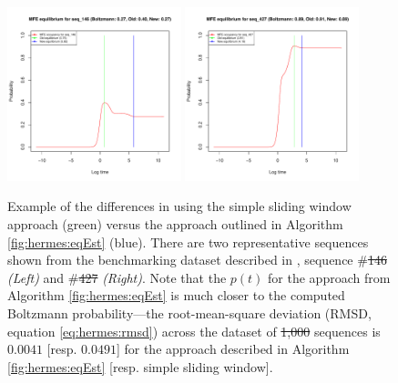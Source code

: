\documentclass[11pt, oneside]{Thesis} %
\providecommand{\DIFadd}[1]{{\protect\color{blue}\uwave{#1}}} %
\providecommand{\DIFdel}[1]{{\protect\color{red}\sout{#1}}}                      %
\providecommand{\DIFaddFL}[1]{\DIFadd{#1}} %
\providecommand{\DIFdelFL}[1]{\DIFdel{#1}} %
\providecommand{\DIFaddbeginFL}{} %
\providecommand{\DIFaddendFL}{} %
\providecommand{\DIFdelbeginFL}{} %
\providecommand{\DIFdelendFL}{} %
\begin{document}
\begin{figure}[!ht]
\centering
\includegraphics[width=0.45\textwidth]{Figures/Hermes/eqEstFromRnaEqSeq146.pdf}
\quad
\includegraphics[width=0.45\textwidth]{Figures/Hermes/eqEstFromRnaEqSeq427.pdf}
\caption[Example of the differences in using a sliding window approach for estimating \eqt versus a more robust approach, outlined in Algorithm \ref{fig:hermes:eqEst}]{Example of the differences in using the simple sliding window
approach (green) versus the approach outlined in Algorithm \ref{fig:hermes:eqEst}
(blue). There are two representative sequences shown from the benchmarking
dataset described in , sequence \#\DIFdelbeginFL \DIFdelFL{146
}\DIFdelendFL \DIFaddbeginFL \DIFaddFL{$146$
}\DIFaddendFL {\em (Left)} and \#\DIFdelbeginFL \DIFdelFL{427 }\DIFdelendFL \DIFaddbeginFL \DIFaddFL{$427$ }\DIFaddendFL {\em (Right)}. Note that the $p(t)$ for the approach from
Algorithm \ref{fig:hermes:eqEst} is much closer to the computed Boltzmann
probability---the root-mean-square deviation (RMSD, equation
\ref{eq:hermes:rmsd}) across the dataset of \DIFdelbeginFL \DIFdelFL{1,000 }\DIFdelendFL \DIFaddbeginFL \DIFaddFL{$1,000$ }\DIFaddendFL sequences is $0.0041$
[resp. $0.0491$] for the approach described in Algorithm \ref{fig:hermes:eqEst}
[resp. simple sliding window].}
\label{fig:hermes:eqEstFromRnaEq}
\end{figure}
\end{document}

